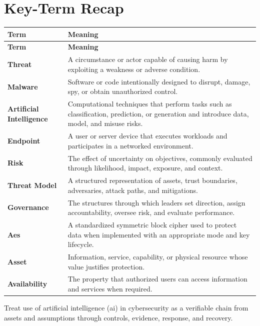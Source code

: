 \documentclass[11pt]{article}
\begin{document}
\section*{Key-Term Recap}
\begin{longtable}{>{\RaggedRight\arraybackslash}p{}>{\RaggedRight\arraybackslash}p{}}
\toprule\rowcolor{Navy}\color{white}\textbf{Term} & \color{white}\textbf{Meaning}\\\midrule
\endfirsthead
\toprule\rowcolor{Navy}\color{white}\textbf{Term} & \color{white}\textbf{Meaning}\\\midrule
\endhead
\textbf{Threat} & A circumstance or actor capable of causing harm by exploiting a weakness or adverse condition. \\\midrule
\textbf{Malware} & Software or code intentionally designed to disrupt, damage, spy, or obtain unauthorized control. \\\midrule
\textbf{Artificial Intelligence} & Computational techniques that perform tasks such as classification, prediction, or generation and introduce data, model, and misuse risks. \\\midrule
\textbf{Endpoint} & A user or server device that executes workloads and participates in a networked environment. \\\midrule
\textbf{Risk} & The effect of uncertainty on objectives, commonly evaluated through likelihood, impact, exposure, and context. \\\midrule
\textbf{Threat Model} & A structured representation of assets, trust boundaries, adversaries, attack paths, and mitigations. \\\midrule
\textbf{Governance} & The structures through which leaders set direction, assign accountability, oversee risk, and evaluate performance. \\\midrule
\textbf{Aes} & A standardized symmetric block cipher used to protect data when implemented with an appropriate mode and key lifecycle. \\\midrule
\textbf{Asset} & Information, service, capability, or physical resource whose value justifies protection. \\\midrule
\textbf{Availability} & The property that authorized users can access information and services when required. \\\midrule
\bottomrule
\end{longtable}
\begin{takeawaybox}
Treat use of artificial intelligence (ai) in cybersecurity as a verifiable chain from assets and assumptions through controls, evidence, response, and recovery.
\end{takeawaybox}
\end{document}

